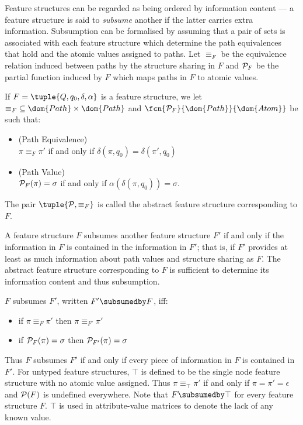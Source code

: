 \documentclass[12pt]{report}
\begin{document}
Feature structures can be regarded as being ordered by information
content --- a feature structure is said
to {\em subsume} another if the latter carries extra information.
Subsumption can be formalised by assuming that
a pair of sets is associated with each feature structure
which determine the path equivalences that hold and the
atomic values assigned to paths.  
Let $\equiv_{F}$ be the equivalence relation induced
between paths by the structure sharing in $F$ and ${\cal P}_{F}$ be
the partial function induced by $F$ which maps paths in $F$ to atomic
values. 
%
\begin{definition}
If $F = \tuple{Q,q_{0},\delta,\alpha}$ is a feature structure, we let
$\equiv_{F} \; \subseteq \dom{Path} \times \dom{Path}$ and
$\fcn{{\cal P}_{F}}{\dom{Path}}{\dom{Atom}}$ be such that:
\begin{itemize}
\item
(Path Equivalence) \\
$\pi \equiv_{F} \pi'$ 
if and only if $\delta(\pi,q_{0}) = \delta(\pi',q_{0})$
\item
(Path Value) \\
${\cal P}_{F}(\pi) = \sigma$ 
if and only if
$\alpha(\delta(\pi,q_{0})) = \sigma$.
\end{itemize}
The pair $\tuple{{\cal P},\equiv_{F}}$ is called the abstract
feature structure corresponding to $F$.
\end{definition}
%

A feature structure $F$ subsumes another feature
structure $F'$ if and only if the information in $F$ is contained in
the information in $F'$;  that is, if $F'$ provides at least as much
information about path values and structure sharing as $F$.  The
abstract feature structure corresponding to $F$ is sufficient to
determine its information content and thus subsumption.
%
\begin{definition}[Subsumption]
$F$ subsumes $F'$, written $F' \subsumedby F$, iff:
\begin{itemize}
\item if $\pi \equiv_{F} \pi'$ then $\pi \equiv_{F'} \pi'$
\item if ${\cal P}_{F}(\pi) = \sigma$ then ${\cal P}_{F'}(\pi) = \sigma$
\end{itemize}
\end{definition}
%
Thus $F$ subsumes $F'$ if and only if every piece of information in
$F$ is contained in $F'$.   For untyped feature structures,
$\top$ is defined to be the single node feature structure with no atomic
value assigned.  Thus $\pi \equiv_{\top} \pi'$ if and only if $\pi =
\pi' = \epsilon$ and ${\cal P}(F)$ is undefined everywhere.  Note that
$F \subsumedby \top $ for every feature structure $F$.  $\top$ is used
in attribute-value matrices to denote the lack of
any known value.
\end{document}

